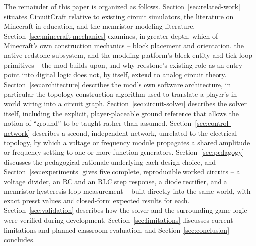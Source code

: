 The remainder of this paper is organized as follows. Section~\ref{sec:related-work}
situates CircuitCraft relative to existing circuit simulators, the literature on
Minecraft in education, and the memristor-modeling literature. Section~\ref{sec:minecraft-mechanics}
examines, in greater depth, which of Minecraft's own construction mechanics -- block
placement and orientation, the native redstone subsystem, and the modding platform's
block-entity and tick-loop primitives -- the mod builds upon, and why redstone's existing
role as an entry point into digital logic does not, by itself, extend to analog circuit
theory. Section~\ref{sec:architecture} describes the mod's own software architecture, in
particular the topology-construction algorithm used to translate a player's in-world wiring
into a circuit graph. Section~\ref{sec:circuit-solver} describes the solver itself,
including the explicit, player-placeable ground reference that allows the notion of
``ground'' to be taught rather than assumed. Section~\ref{sec:control-network} describes a
second, independent network, unrelated to the electrical topology, by which a voltage or
frequency module propagates a shared amplitude or frequency setting to one or more function
generators. Section~\ref{sec:pedagogy} discusses the
pedagogical rationale underlying each design choice, and Section~\ref{sec:experiments} gives
five complete, reproducible worked circuits -- a voltage divider, an RC and an RLC step
response, a diode rectifier, and a memristor hysteresis-loop measurement -- built directly
into the same world, with exact preset values and closed-form expected results for each.
Section~\ref{sec:validation} describes
how the solver and the surrounding game logic were verified during development.
Section~\ref{sec:limitations} discusses current limitations and planned classroom
evaluation, and Section~\ref{sec:conclusion} concludes.
